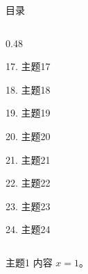 \documentclass[aspectratio=169,10pt,fontset=fandol]{ctexbeamer}
\begin{document}
\begin{frame}[t,fragile]{目录}
\begin{columns}[T,onlytextwidth]
\begin{column}{0.48\textwidth}
{\color{gray!40}\small 17. 主题17\par}\vspace{0.22em}
{\color{gray!40}\small 18. 主题18\par}\vspace{0.22em}
{\color{gray!40}\small 19. 主题19\par}\vspace{0.22em}
{\color{gray!40}\small 20. 主题20\par}\vspace{0.22em}
{\color{gray!40}\small 21. 主题21\par}\vspace{0.22em}
{\color{gray!40}\small 22. 主题22\par}\vspace{0.22em}
{\color{gray!40}\small 23. 主题23\par}\vspace{0.22em}
{\color{gray!40}\small 24. 主题24\par}\vspace{0.22em}
\end{column}
\end{columns}
\end{frame}
\begin{frame}[t,fragile]{主题1}
\normalsize
{\normalsize
内容 $x=1$。
}
\end{frame}
\end{document}
